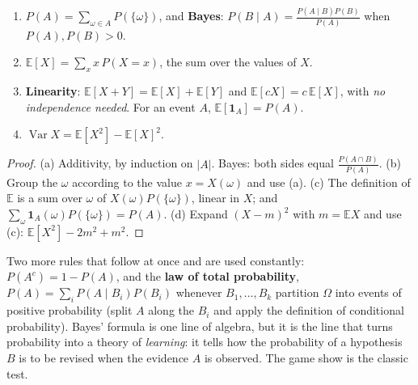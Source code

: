 \begin{proposition}\label{prop:proba}
\begin{enumerate}[label=(\alph*)]
\item $P(A)=\sum_{\omega\in A}P(\{\omega\})$, and \textbf{Bayes}: $P(B\mid A)=\frac{P(A\mid B)P(B)}{P(A)}$ when $P(A),P(B)>0$.
\item $\mathbb E[X]=\sum_xx\,P(X=x)$, the sum over the values of $X$.
\item \textbf{Linearity}: $\mathbb E[X+Y]=\mathbb E[X]+\mathbb E[Y]$ and $\mathbb E[cX]=c\,\mathbb E[X]$, with \emph{no independence needed}. For an event $A$, $\mathbb E[\mathbf 1_A]=P(A)$.
\item $\operatorname{Var}X=\mathbb E[X^2]-\mathbb E[X]^2$.
\end{enumerate}
\end{proposition}
\begin{proof}
(a) Additivity, by induction on $|A|$. Bayes: both sides equal $\frac{P(A\cap B)}{P(A)}$.
(b) Group the $\omega$ according to the value $x=X(\omega)$ and use (a).
(c) The definition of $\mathbb E$ is a sum over $\omega$ of $X(\omega)P(\{\omega\})$, linear in $X$; and $\sum_\omega\mathbf 1_A(\omega)P(\{\omega\})=P(A)$.
(d) Expand $(X-m)^2$ with $m=\mathbb E X$ and use (c): $\mathbb E[X^2]-2m^2+m^2$.
\end{proof}

Two more rules that follow at once and are used constantly: $P(A^c)=1-P(A)$, and the \textbf{law of total probability}, $P(A)=\sum_iP(A\mid B_i)P(B_i)$ whenever $B_1,\dots,B_k$ partition $\Omega$ into events of positive probability (split $A$ along the $B_i$ and apply the definition of conditional probability). Bayes' formula is one line of algebra, but it is the line that turns probability into a theory of \emph{learning}: it tells how the probability of a hypothesis $B$ is to be revised when the evidence $A$ is observed. The game show is the classic test.

